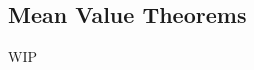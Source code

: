 \documentclass[../poma-notes.tex]{subfiles}
\begin{document}
\subsection*{Mean Value Theorems}

WIP
\end{document}
